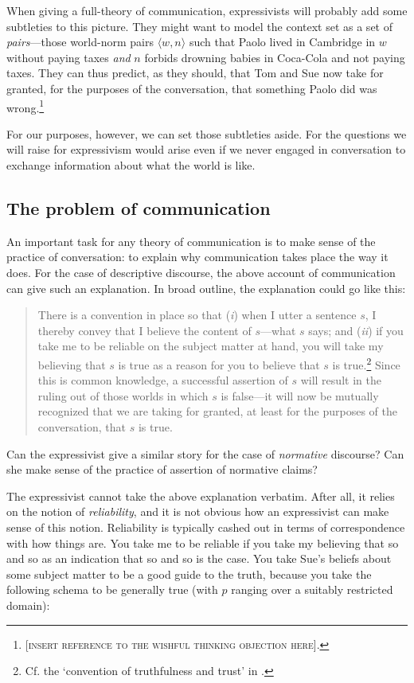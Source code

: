 \documentclass[11pt,article,oneside]{memoir}
\begin{document}
When giving a full-theory of communication, expressivists will probably add some subtleties to this picture. They might want to model the context set as a set of \emph{pairs}---those world-norm pairs $\langle w, n \rangle$ such that Paolo lived in Cambridge in $w$ without paying taxes \emph{and} $n$ forbids drowning babies in Coca-Cola and not paying taxes. They can thus predict, as they should, that Tom and Sue now take for granted, for the purposes of the conversation, that something Paolo did was wrong.\footnote{[\textsc{insert reference to the wishful thinking objection here}].}

For our purposes, however, we can set those subtleties aside. For the questions we will raise for expressivism would arise even if we never engaged in conversation to exchange information about what the world is like.  

\subsection{The problem of communication}

An important task for any theory of communication is to make sense of the practice of conversation: to explain why communication takes place the way it does. For the case of descriptive discourse, the above account of communication can give such an explanation. In broad outline, the explanation could go like this:

\begin{quote}
There is a convention in place so that (\emph{i}) when I utter a sentence $s$, I thereby convey that I believe the content of $s$---what $s$ says; and (\emph{ii}) if you take me to be reliable on the subject matter at hand, you will take my believing that $s$ is true as a reason for you to believe that $s$ is true.\footnote{Cf. the `convention of truthfulness and trust' in \citealt{lewis1975}.} Since this is common knowledge, a successful assertion of $s$ will result in the ruling out of those worlds in which $s$ is false---it will now be mutually recognized that we are taking for granted, at least for the purposes of the conversation, that $s$ is true.
\end{quote}

Can the expressivist give a similar story for the case of \emph{normative} discourse? Can she make sense of the practice of assertion of normative claims? 

The expressivist cannot take the above explanation verbatim. After all, it relies on the notion of \emph{reliability}, and it is not obvious how an expressivist can make sense of this notion. Reliability is typically cashed out in terms of correspondence with how things are. You take me to be reliable if you take my believing that so and so as an indication that so and so is the case. You take Sue's beliefs about some subject matter to be a good guide to the truth, because you take the following schema to be generally true (with $p$ ranging over a suitably restricted domain): 
\end{document}

